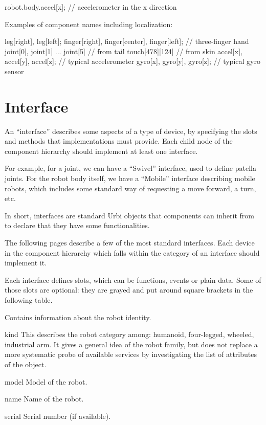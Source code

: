 \begin{urbiunchecked}
robot.body.accel[x]; // accelerometer in the x direction
\end{urbiunchecked}


Examples of component names including localization:

\begin{urbiunchecked}
leg[right], leg[left];
finger[right], finger[center], finger[left];  // three-finger hand
joint[0], joint[1] ... joint[5]               // from tail
touch[478][124]                               // from skin
accel[x], accel[y], accel[z];                 // typical accelerometer
gyro[x], gyro[y], gyro[z];                    // typical gyro sensor
\end{urbiunchecked}

\section{Interface}
\label{sec:interface}

An ``interface'' describes some aspects of a type of device, by specifying
the slots and methods that implementations must provide. Each child node of
the component hierarchy should implement at least one interface.

For example, for a joint, we can have a ``Swivel'' interface, used to define
patella joints. For the robot body itself, we have a ``Mobile'' interface
describing mobile robots, which includes some standard way of requesting a
move forward, a turn, etc.

In short, interfaces are standard Urbi objects that components can inherit
from to declare that they have some functionalities.

The following pages describe a few of the most standard interfaces. Each
device in the component hierarchy which falls within the category of an
interface should implement it.

Each interface defines slots, which can be functions, events or plain data.
Some of those slots are optional: they are grayed and put around square
brackets in the following table.


Contains information about the robot identity.

\begin{urbiscriptapi}
\item[kind]%
  This describes the robot category among: humanoid, four-legged, wheeled,
  industrial arm. It gives a general idea of the robot family, but does not
  replace a more systematic probe of available services by investigating the
  list of attributes of the object.


\item[model] Model of the robot.


\item[name]%
  Name of the robot.


\item[serial] Serial number (if available).
\end{urbiscriptapi}


